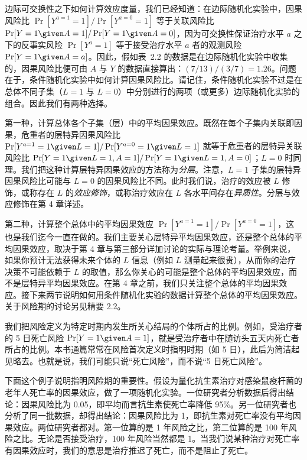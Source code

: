 边际可交换性之下如何计算效应度量，我们已经知道：在边际随机化实验中，因果风险比 $\Pr[Y^{a=1}=1]/\Pr[Y^{a=0}=1]$ 等于关联风险比 $\Pr[Y=1\given A=1]/\Pr[Y=1\given A=0]$，因为可交换性保证治疗水平 $a$ 之下的反事实风险 $\Pr[Y^{a}=1]$ 等于接受治疗水平 $a$ 者的观测风险 $\Pr[Y=1\given A=a]$。因此，假如表~2.2 的数据是在边际随机化实验中收集的，因果风险比便可由 $A$ 与 $Y$ 的数据直接算出：$(7/13)/(3/7)=1.26$。问题在于，条件随机化实验中如何计算因果风险比。请记住，条件随机化实验不过是在总体不同子集（$L=1$ 与 $L=0$）中分别进行的两项（或更多）边际随机化实验的组合。因此我们有两种选择。

第一种，计算总体各个子集（层）中的平均因果效应。既然在每个子集内关联即因果，危重者的层特异因果风险比 $\Pr[Y^{a=1}=1\given L=1]/\Pr[Y^{a=0}=1\given L=1]$ 就等于危重者的层特异关联风险比 $\Pr[Y=1\given L=1,A=1]/\Pr[Y=1\given L=1,A=0]$；$L=0$ 时同理。我们把这种计算层特异因果效应的方法称为\emph{分层}。注意，$L=1$ 子集的层特异因果风险比可能与 $L=0$ 的因果风险比不同。此时我们说，治疗的效应被 $L$ 修饰，或称存在 $L$ 的\emph{效应修饰}，或称治疗效应在 $L$ 各水平间存在\emph{异质性}。分层与效应修饰在第 4 章详述。

第二种，计算整个总体中的平均因果效应 $\Pr[Y^{a=1}=1]/\Pr[Y^{a=0}=1]$，这也是我们迄今一直在做的。我们主要关心层特异平均因果效应，还是整个总体的平均因果效应，取决于第 4 章与第三部分详加讨论的实际与理论考量。举例来说，如果你预计无法获得未来个体的 $L$ 信息（例如 $L$ 测量起来很贵），从而你的治疗决策不可能依赖于 $L$ 的取值，那么你关心的可能是整个总体的平均因果效应，而不是层特异平均因果效应。在第 4 章之前，我们只关注整个总体的平均因果效应。接下来两节说明如何用条件随机化实验的数据计算整个总体的平均因果效应。关于风险期的讨论另见精要 2.2。

\begin{finepoint}[风险期]
我们把风险定义为特定时期内发生所关心结局的个体所占的比例。例如，受治疗者的 5 日死亡风险 $\Pr[Y=1\given A=1]$，就是受治疗者中在随访头五天内死亡者所占的比例。本书通篇常常在风险首次定义时指明时期（如 5 日），此后为简洁起见略去。也就是说，我们可能只说“死亡风险”，而不说“5 日死亡风险”。

下面这个例子说明指明风险期的重要性。假设为量化抗生素治疗对感染鼠疫杆菌的老年人死亡率的因果效应，做了一项随机化实验。一位研究者分析数据后得出结论：因果风险比为 0.05，即平均而言抗生素使死亡率降低 95\%。另一位研究者也分析了同一批数据，却得出结论：因果风险比为 1，即抗生素对死亡率没有平均因果效应。两位研究者都对。第一位算的是 1 年风险之比，第二位算的是 100 年风险之比。无论是否接受治疗，100 年风险当然都是 1。当我们说某种治疗对死亡率有因果效应时，我们的意思是治疗推迟了死亡，而不是阻止了死亡。
\end{finepoint}

